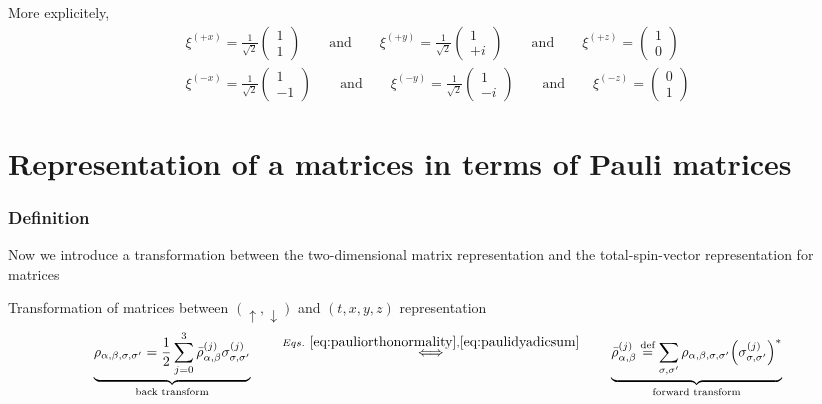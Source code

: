 \documentclass[11pt,a4paper]{report}
\begin{document}
More explicitely, 
\begin{eqnarray}
\xi^{(+ x)}=\frac{1}{\sqrt{2}}\left(\begin{array}{r}1\\1\end{array}\right)
\qquad\text{and}\qquad
\xi^{(+ y)}=\frac{1}{\sqrt{2}}\left(\begin{array}{r}1\\+ i\end{array}\right)
\qquad\text{and}\qquad
\xi^{(+ z)}=\left(\begin{array}{c}1\\0\end{array}\right)
\nonumber\\
\xi^{(- x)}=\frac{1}{\sqrt{2}}\left(\begin{array}{r}1\\-1\end{array}\right)
\qquad\text{and}\qquad
\xi^{(- y)}=\frac{1}{\sqrt{2}}\left(\begin{array}{r}1\\- i\end{array}\right)
\qquad\text{and}\qquad
\xi^{(- z)}=\left(\begin{array}{c}0\\1\end{array}\right)
\end{eqnarray}




\section{Representation of a matrices in terms of Pauli matrices}
\subsubsection{Definition}
Now we introduce a transformation between the two-dimensional matrix
representation and the total-spin-vector representation for matrices
\begin{myshadowminipage}{Transformation of matrices between 
$(\uparrow,\downarrow)$ and $(t,x,y,z)$ representation}
\begin{eqnarray}
\underbrace{\rho_{\alpha,\beta,\sigma,\sigma'}=\frac{1}{2}
\sum_{j=0}^3\bar{\rho}^{(j)}_{\alpha,\beta}\sigma^{(j)}_{\sigma,\sigma'}
}_{\text{back transform}}
\qquad\stackrel{Eqs.~\ref{eq:pauliorthonormality},\ref{eq:paulidyadicsum}}
{\Longleftrightarrow}\qquad
\underbrace{\bar{\rho}^{(j)}_{\alpha,\beta}\stackrel{\text{def}}{=}\sum_{\sigma,\sigma'} 
\rho_{\alpha,\beta,\sigma,\sigma'}\Bigr(\sigma^{(j)}_{\sigma,\sigma'}\Bigr)^*
}_{\text{forward transform}}
\label{eq:defdensitymatrixwithspindeptotandcart}
\end{eqnarray}
\end{myshadowminipage}
\end{document}
